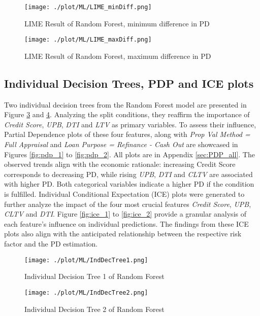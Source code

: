 \begin{figure}[H]
	\centering
	\texttt{[image: ./plot/ML/LIME\_minDiff.png]}
    \caption{LIME Result of Random Forest, minimum difference in PD}
    \label{fig:re_LIMEres_min}
\end{figure}

\begin{figure}[H]
	\centering
	\texttt{[image: ./plot/ML/LIME\_maxDiff.png]}
    \caption{LIME Result of Random Forest, maximum difference in PD}
    \label{fig:re_LIMEres_max}
\end{figure}

\subsection{Individual Decision Trees, PDP and ICE plots}
Two individual decision trees from the Random Forest model are presented in Figure \ref{fig:re_indtree1} and \ref{fig:re_indtree2}. Analyzing the split conditions, they reaffirm the importance of \emph{Credit Score}, \emph{UPB}, \emph{DTI} and \emph{LTV} as primary variables. To assess their influence, Partial Dependence plots of these four features, along with \emph{Prop Val Method = Full Appraisal} and \emph{Loan Purpose = Refinance - Cash Out} are showcased in Figures \ref{fig:pdp_1} to \ref{fig:pdp_2}. All plots are in Appendix \ref{sec:PDP_all}. The observed trends align with the economic rationale: increasing Credit Score corresponds to decreasing PD, while rising \emph{UPB}, \emph{DTI} and \emph{CLTV} are associated with higher PD. Both categorical variables indicate a higher PD if the condition is fulfilled. Individual Conditional Expectation (ICE) plots were generated to further analyze the impact of the four most crucial features \emph{Credit Score}, \emph{UPB}, \emph{CLTV} and \emph{DTI}. Figure \ref{fig:ice_1} to \ref{fig:ice_2} provide a granular analysis of each feature's influence on individual predictions. The findings from these ICE plots also align with the anticipated relationship between the respective risk factor and the PD estimation.

\begin{figure}[H]
	\centering
	\texttt{[image: ./plot/ML/IndDecTree1.png]}
    \caption{Individual Decision Tree 1 of Random Forest}
    \label{fig:re_indtree1}
\end{figure}

\begin{figure}[H]
	\centering
	\texttt{[image: ./plot/ML/IndDecTree2.png]}
    \caption{Individual Decision Tree 2 of Random Forest}
    \label{fig:re_indtree2}
\end{figure}

